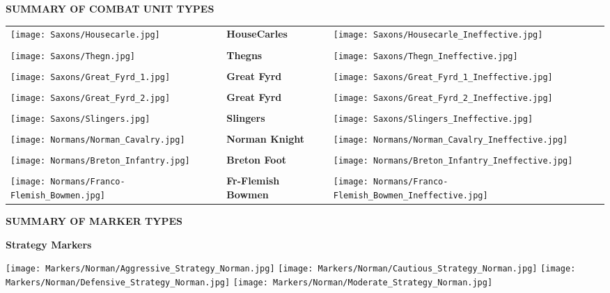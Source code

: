 \par
\begin{center}
  \textbf{SUMMARY OF COMBAT UNIT TYPES}
  \break
\end{center}

\begin{tabularx}{0.5\textwidth}{
    >{\raggedright\arraybackslash}X
    >{\centering\arraybackslash}X
    >{\raggedleft\arraybackslash}X}

  \texttt{[image: Saxons/Housecarle.jpg]} & \textbf{HouseCarles} & \texttt{[image: Saxons/Housecarle\_Ineffective.jpg]} \\ \\
  \texttt{[image: Saxons/Thegn.jpg]} & \textbf{Thegns} & \texttt{[image: Saxons/Thegn\_Ineffective.jpg]} \\ \\
  \texttt{[image: Saxons/Great\_Fyrd\_1.jpg]} & \textbf{Great Fyrd} & \texttt{[image: Saxons/Great\_Fyrd\_1\_Ineffective.jpg]} \\ \\
  \texttt{[image: Saxons/Great\_Fyrd\_2.jpg]} & \textbf{Great Fyrd} & \texttt{[image: Saxons/Great\_Fyrd\_2\_Ineffective.jpg]} \\ \\
  \texttt{[image: Saxons/Slingers.jpg]} & \textbf{Slingers} & \texttt{[image: Saxons/Slingers\_Ineffective.jpg]} \\ \\
  \texttt{[image: Normans/Norman\_Cavalry.jpg]} & \textbf{Norman Knight} & \texttt{[image: Normans/Norman\_Cavalry\_Ineffective.jpg]} \\ \\
  \texttt{[image: Normans/Breton\_Infantry.jpg]} & \textbf{Breton Foot} & \texttt{[image: Normans/Breton\_Infantry\_Ineffective.jpg]} \\ \\
  \texttt{[image: Normans/Franco-Flemish\_Bowmen.jpg]} & \textbf{Fr-Flemish Bowmen} & \texttt{[image: Normans/Franco-Flemish\_Bowmen\_Ineffective.jpg]}
\end{tabularx}

\par
\begin{center}
  \textbf{SUMMARY OF MARKER TYPES}
  \break
  \par
  \textbf{Strategy Markers}
\end{center}

\hspace{1em}
\texttt{[image: Markers/Norman/Aggressive\_Strategy\_Norman.jpg]}
\hspace{1em}
\texttt{[image: Markers/Norman/Cautious\_Strategy\_Norman.jpg]}
\hspace{1em}
\texttt{[image: Markers/Norman/Defensive\_Strategy\_Norman.jpg]}
\hspace{1em}
\texttt{[image: Markers/Norman/Moderate\_Strategy\_Norman.jpg]}

